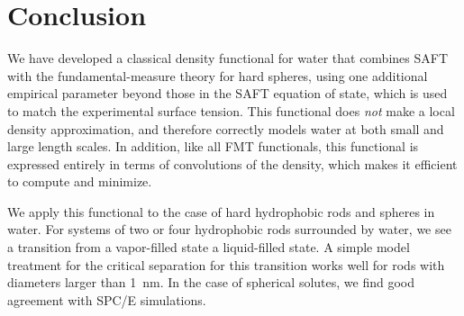 \documentclass[twocolumn,amsmath,amssymb,prl]{revtex4-1}
\begin{document}
\section{Conclusion}

We have developed a classical density functional for water that
combines SAFT with the fundamental-measure theory for hard spheres,
using one additional empirical parameter beyond those in the SAFT
equation of state, which is used to match the experimental surface
tension.  This functional does \emph{not} make a local density
approximation, and therefore correctly models water at both small and
large length scales.  In addition, like all FMT functionals, this
functional is expressed entirely in terms of convolutions of the
density, which makes it efficient to compute and minimize.

We apply this functional to the case of hard hydrophobic rods and
spheres in water.  For systems of two or four hydrophobic rods
surrounded by water, we see a transition from a vapor-filled state a
liquid-filled state.  A simple model treatment for the critical
separation for this transition works well for rods with diameters
larger than 1~nm.  In the case of spherical solutes, we find good
agreement with SPC/E simulations.

\end{document}
